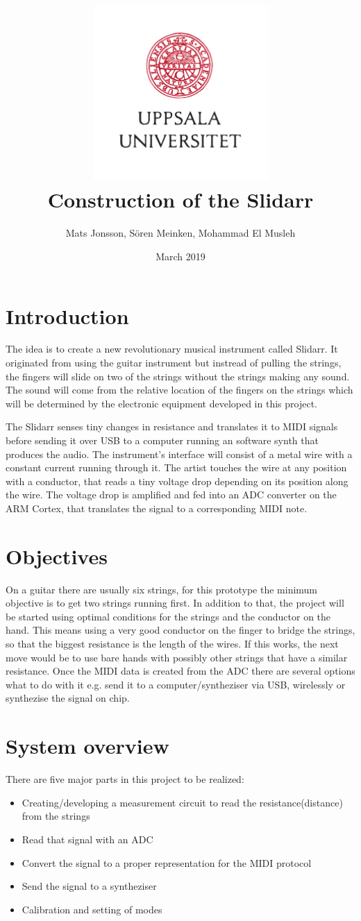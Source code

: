 \documentclass{article}
\title{\includegraphics[width=0.5\textwidth]{UU_logo.pdf}\\
Construction of the Slidarr}
\author{Mats Jonsson, Sören Meinken, Mohammad El Musleh}
\date{March 2019}
\begin{document}
\maketitle

\section{Introduction}
The idea is to create a new revolutionary musical instrument called Slidarr. It originated from using the guitar instrument but instread of pulling the strings, the fingers will slide on two of the strings without the strings making any sound. The sound will come from the relative location of the fingers on the strings which will be determined by the electronic equipment developed in this project.

The Slidarr senses tiny changes in resistance and translates it to MIDI signals before sending it over USB to a computer running an software synth that produces the audio. The instrument's interface will consist of a metal wire with a constant current running through it. The artist touches the wire at any position with a conductor, that reads a tiny voltage drop depending on its position along the wire. The voltage drop is amplified and fed into an ADC converter on the ARM Cortex, that translates the signal to a corresponding MIDI note.

\section{Objectives}
On a guitar there are usually six strings, for this prototype the minimum objective is to get two strings running first. In addition to that, the project will be started using optimal conditions for the strings and the conductor on the hand. This means using a very good conductor on the finger to bridge the strings, so that the biggest resistance is the length of the wires. If this works, the next move would be to use bare hands with possibly other strings that have a similar resistance. Once the MIDI data is created from the ADC there are several options what to do with it e.g. send it to a computer/syntheziser via USB, wirelessly or synthezise the signal on chip.

\section{System overview}


There are five major parts in this project to be realized:
\begin{itemize}
    \item Creating/developing a measurement circuit to read the resistance(distance) from the strings
    \item Read that signal with an ADC
    \item Convert the signal to a proper representation for the MIDI protocol
    \item Send the signal to a syntheziser
    \item Calibration and setting of modes
\end{itemize}
\end{document}
